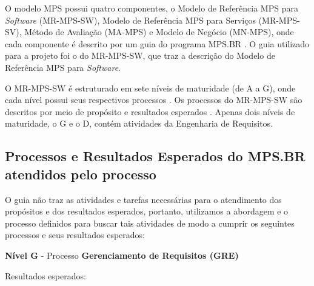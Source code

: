       O modelo MPS possui quatro componentes, o Modelo de Referência MPS para \textit{Software} (MR-MPS-SW), Modelo de Referência MPS para
      Serviços (MR-MPS-SV), Método de Avaliação (MA-MPS) e Modelo de Negócio (MN-MPS), onde cada componente é descrito por um guia
      do programa MPS.BR \cite{softex12}.
      O guia utilizado para a projeto foi o do MR-MPS-SW, que traz a descrição do Modelo de Referência MPS para \textit{Software}.
      
      O MR-MPS-SW é estruturado em sete níveis de maturidade (de A a G), onde cada nível possui seus respectivos processos \cite{softex12}.
      Os processos do MR-MPS-SW são descritos por meio de propósito e resultados esperados \cite{softex12}.
      Apenas dois níveis de maturidade, o G e o D, contém atividades da Engenharia de Requisitos.
      
    \subsection{Processos e Resultados Esperados do MPS.BR atendidos pelo processo}
    
      O guia não traz as atividades e tarefas necessárias para o atendimento dos propósitos e dos resultados esperados, portanto,
      utilizamos a abordagem e o processo definidos para buscar tais atividades de modo a cumprir os seguintes processos
      e seus resultados esperados:\linebreak
      
      \noindent
      \textbf{Nível G} - Processo \textbf{Gerenciamento de Requisitos (GRE)}
	  
	  \noindent
	  Resultados esperados:
	  

